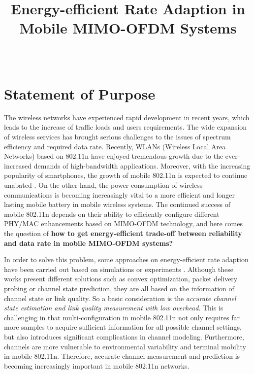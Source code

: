 \documentclass[draftclsnofoot,journal,onecolumn,11pt]{IEEEtran}
\begin{document}
\title{Energy-efficient Rate Adaption in Mobile MIMO-OFDM Systems}

\author{ \\
}

\maketitle
%


\section{Statement of Purpose}

The wireless networks have experienced rapid development in recent years, which leads to the increase of traffic loads and users requirements. The wide expansion of wireless services has brought serious challenges to the issues of spectrum efficiency and required data rate. Recently, WLANs (Wireless Local Area Networks) based on 802.11n have enjoyed tremendous growth due to the ever-increased demands of high-bandwidth applications. Moreover, with the increasing popularity of smartphones, the growth of mobile 802.11n is expected to continue unabated \cite{Bala2010wifi}. On the other hand, the power consumption of wireless communications is becoming increasingly vital to a more efficient and longer lasting mobile battery in mobile wireless systems. The continued success of mobile 802.11n depends on their ability to efficiently configure different PHY/MAC enhancements based on MIMO-OFDM technology, and here comes the question of \textbf{how to get energy-efficient trade-off between reliability and data rate in mobile MIMO-OFDM systems?}

In order to solve this problem, some approaches on energy-efficient rate adaption have been carried out based on simulations \cite{5510775} \cite{6214414} or experiments \cite{Peng:2011:TPS:2030613.2030628} \cite{Li:2012:ERA:2348543.2348585}. Although these works present different solutions such as convex optimization, packet delivery probing or channel state prediction, they are all based on the information of channel state or link quality. So a basic consideration is the \textit{accurate channel state estimation and link quality measurement with low overhead}. This is challenging in that multi-configuration in mobile 802.11n not only requires far more samples to acquire sufficient information for all possible channel settings, but also introduces significant complications in channel modeling. Furthermore, channels are more vulnerable to environmental variability and terminal mobility in mobile 802.11n. Therefore, accurate channel measurement and prediction is becoming increasingly important in mobile 802.11n networks.
\end{document}
